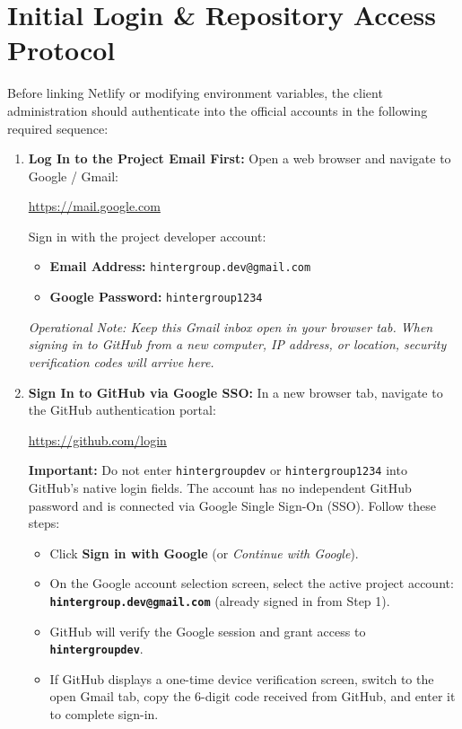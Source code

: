 \documentclass[11pt,a4paper,oneside]{book}
\begin{document}
\section{Initial Login \& Repository Access Protocol}
Before linking Netlify or modifying environment variables, the client administration should authenticate into the official accounts in the following required sequence:

\begin{enumerate}[leftmargin=*,label=\textbf{Step \arabic*:}]
  \item \textbf{Log In to the Project Email First:}
    Open a web browser and navigate to Google / Gmail:
    \begin{center}
      \url{https://mail.google.com}
    \end{center}
    Sign in with the project developer account:
    \begin{itemize}[leftmargin=1.2cm]
      \item \textbf{Email Address:} \texttt{hintergroup.dev@gmail.com}
      \item \textbf{Google Password:} \texttt{hintergroup1234}
    \end{itemize}
    \textit{Operational Note: Keep this Gmail inbox open in your browser tab. When signing in to GitHub from a new computer, IP address, or location, security verification codes will arrive here.}

  \item \textbf{Sign In to GitHub via Google SSO:}
    In a new browser tab, navigate to the GitHub authentication portal:
    \begin{center}
      \url{https://github.com/login}
    \end{center}
    \textbf{Important:} Do not enter \texttt{hintergroupdev} or \texttt{hintergroup1234} into GitHub's native login fields. The account has no independent GitHub password and is connected via Google Single Sign-On (SSO). Follow these steps:
    \begin{itemize}[leftmargin=1.2cm]
      \item Click \textbf{Sign in with Google} (or \textit{Continue with Google}).
      \item On the Google account selection screen, select the active project account:\\
        \textbf{\texttt{hintergroup.dev@gmail.com}} (already signed in from Step 1).
      \item GitHub will verify the Google session and grant access to \textbf{\texttt{hintergroupdev}}.
      \item If GitHub displays a one-time device verification screen, switch to the open Gmail tab, copy the 6-digit code received from GitHub, and enter it to complete sign-in.
    \end{itemize}


\end{enumerate}
\end{document}
